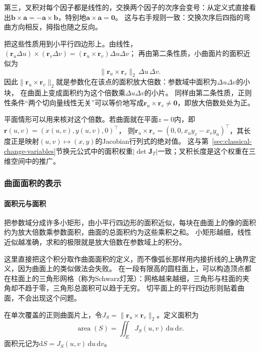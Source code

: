 第三，叉积对每个因子都是线性的，交换两个因子的次序会变号：从定义式直接看出$\bm b\times\bm a=-\bm a\times\bm b$，特别地$\bm a\times\bm a=\bm0$。
这与右手规则一致：交换次序后四指的弯曲方向相反，拇指也随之反向。

把这些性质用到小平行四边形上。由线性，
$(\bm r_u\Delta u)\times(\bm r_v\Delta v)=(\bm r_u\times\bm r_v)\Delta u\Delta v$；
再由第二条性质，小曲面片的面积近似为
\[
 \lVert\bm r_u\times\bm r_v\rVert_2\,\Delta u\,\Delta v.
\]
因此$\lVert\bm r_u\times\bm r_v\rVert_2$就是参数化在该点的面积放大倍数：参数域中面积为$\Delta u\Delta v$的小块，
在曲面上变成面积约为这个倍数乘$\Delta u\Delta v$的小片。
同样由第二条性质，正则性条件“两个切向量线性无关”可以等价地写成$\bm r_u\times\bm r_v\ne\bm0$，即放大倍数处处为正。

平面情形可以用来核对这个倍数。若曲面就在平面$z=0$内，即$\bm r(u,v)=(x(u,v),y(u,v),0)^\top$，
则$\bm r_u\times\bm r_v=(0,0,x_uy_v-x_vy_u)^\top$，其长度正是映射$(u,v)\mapsto(x,y)$的Jacobian行列式的绝对值。
这与第~\ref{sec:classical-change-variables}节换元公式中的面积权重$|\det\bm J_T|$一致；叉积长度是这个权重在三维空间中的推广。

\subsubsection{曲面面积的表示}

\paragraph{面积元与面积}

把参数域分成许多小矩形，由小平行四边形的面积近似，每块在曲面上的像的面积约为放大倍数乘参数面积，曲面的总面积约为这些乘积之和。
小矩形越细，线性近似越准确，求和的极限就是放大倍数在参数域上的积分。

这里直接把这个积分取作曲面面积的定义，而不像弧长那样用内接折线的上确界定义，因为曲面上的类似做法会失败。
在一段有限高的圆柱面上，可以构造顶点都在柱面上的三角形网格（称为Schwarz灯笼）：网格越来越细，三角形与柱面的夹角却不趋于零，三角形总面积可以趋于无穷。
切平面上的平行四边形则贴着曲面，不会出现这个问题。

\begin{definition}[曲面面积]
\label{def:analysis-surface-area-measure}
在单次覆盖的正则曲面片上，令$J_S=\|\bm r_u\times\bm r_v\|_2$。定义面积为
\[
 \operatorname{area}(S)=\iint_E J_S(u,v)\,\mathrm du\,\mathrm dv.
\]
面积元记为$\mathrm dS=J_S(u,v)\,\mathrm du\,\mathrm dv$。
\end{definition}

